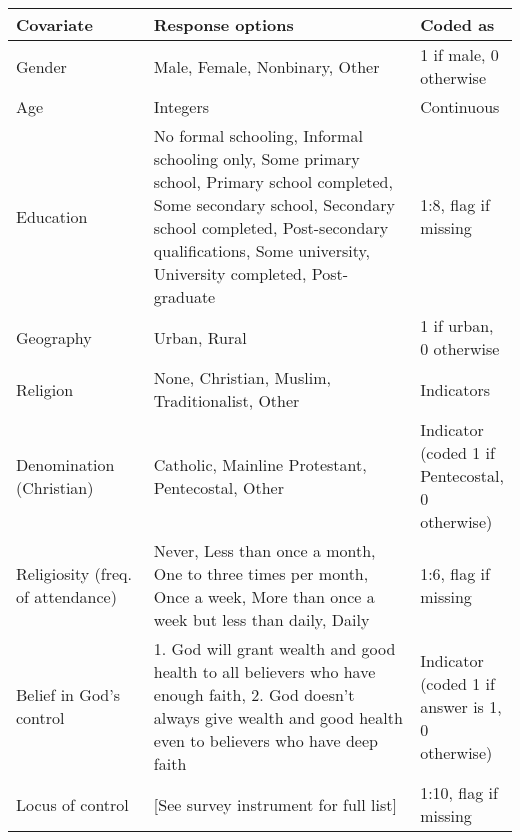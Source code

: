 \begin{table}[H]
\begin{adjustbox}{totalheight=.9\baselineskip, max width = \textwidth}
\begin{tabular}{p{0.3\linewidth}p{0.7\linewidth}p{0.25\linewidth}}
\textbf{Covariate}                   & \textbf{Response options} & \textbf{Coded as}                                     \\
\hline
Gender                                      & Male,   Female, Nonbinary, Other                           & 1 if male, 0 otherwise  \\
Age                                         & Integers                                                   & Continuous              \\
Education &
  No   formal schooling, Informal schooling only, Some primary school, Primary   school completed, Some secondary school, Secondary school completed,   Post-secondary qualifications, Some university, University completed,   Post-graduate &
  1:8, flag if missing \\
Geography                                   & Urban, Rural                                 & 1 if urban, 0 otherwise \\
Religion                                    & None,   Christian, Muslim, Traditionalist, Other                           & Indicators              \\
Denomination (Christian)  & Catholic, Mainline Protestant, Pentecostal, Other  & Indicator (coded 1 if Pentecostal, 0 otherwise)\\
Religiosity   (freq. of attendance) &
  Never,   Less than once a month, One to three times per month, Once a week, More than   once a week but less than daily, Daily &
  1:6, flag if missing \\
 Belief in God's control & 1. God will grant wealth and good health to all believers who have enough faith, 2. God doesn't always give wealth and good health even to believers who have deep faith & Indicator (coded 1 if answer is 1, 0 otherwise)\\
 Locus of control & 
[See survey instrument for full list] & 1:10, flag if missing\\

\end{tabular}
\end{adjustbox}
\end{table}
